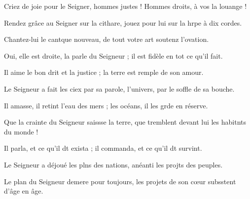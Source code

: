 \item Criez de joie pour le Seigner, hommes justes !\psstar{} Hommes droits, à vos la louange !
\item Rendez grâce au Seigner sur la cithare,\psstar{} jouez pour lui sur la hrpe à dix cordes.
\item Chantez-lui le cantque nouveau,\psstar{} de tout votre art soutenz l’ovation.
\item Oui, elle est droite, la parle du Seigneur ;\psstar{} il est fidèle en tot ce qu’il fait.
\item Il aime le bon drit et la justice ;\psstar{} la terre est remple de son amour.
\item Le Seigneur a fait les ciex par sa parole,\psstar{} l’univers, par le soffle de sa bouche.
\item Il amasse, il retint l’eau des mers ;\psstar{} les océans, il les grde en réserve.
\item Que la crainte du Seigneur saissse la terre,\psstar{} que tremblent devant lui les habitnts du monde !
\item Il parla, et ce qu’il dt exista ;\psstar{} il commanda, et ce qu’il dt survint.
\item Le Seigneur a déjoué les plns des nations,\psstar{} anéanti les projts des peuples.
\item Le plan du Seigneur demere pour toujours,\psstar{} les projets de son cœur subsstent d’âge en âge.